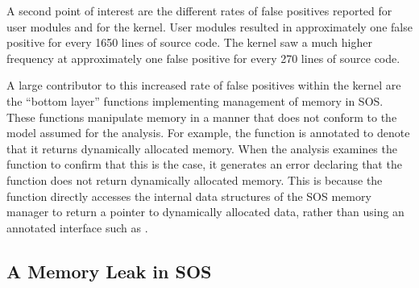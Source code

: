 A second point of interest are the different rates of false positives
reported for user modules and for the kernel.  User modules resulted
in approximately one false positive for every 1650 lines of source
code.  The kernel saw a much higher frequency at approximately one 
false positive for every 270 lines of source code.  

A large contributor to this increased rate of false positives within
the kernel are the ``bottom layer'' functions implementing management
of memory in SOS.  These functions manipulate memory in a manner that
does not conform to the model assumed for the analysis.  For example,
the function  is annotated to denote that
it returns dynamically allocated memory.  When the analysis examines
the function to confirm that this is the case, it generates an error
declaring that the function does not return dynamically allocated
memory.  This is because the function directly accesses the internal
data structures of the SOS memory manager to return a pointer to
dynamically allocated data, rather than using an annotated interface
such as .


%
% 

\subsection{A Memory Leak in SOS}
\label{ss:tale}

